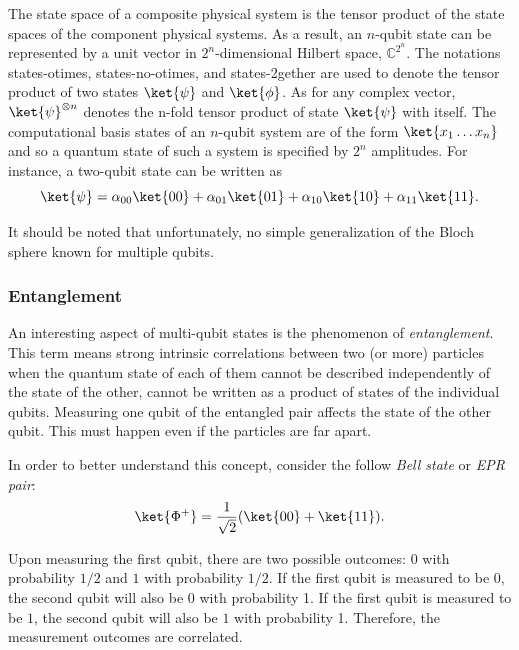  The state space of a composite physical system is the tensor product of the state spaces of the component physical systems. As a result, an $n$-qubit state can be represented by a unit vector in $2^n$-dimensional Hilbert space, $\mathbb{C}^{2^{n}}$. The notations \gls{states-otimes}, \gls{states-no-otimes}, and \gls{states-2gether} are  used to denote the tensor product of two states $\ket{\psi}$ and $\ket{\phi}$. As for any complex vector, $\ket{\psi}^{\otimes n}$ denotes the n-fold tensor product of state $\ket{\psi}$ with itself. The computational basis states of an $n$-qubit system are of the form $\ket{x_{1}\ldots x_{n}}$ and so a quantum state of such a system is specified by $2^{n}$ amplitudes. For instance, a two-qubit state can be written as
\begin{equation*}
  \ket{\psi} = \alpha_{00}\ket{00} + \alpha_{01}\ket{01} + \alpha_{10}\ket{10} + \alpha_{11}\ket{11}.
\end{equation*}

It should be noted that unfortunately, no simple generalization of the Bloch sphere known for multiple qubits.


\subsubsection{Entanglement}
An interesting aspect of multi-qubit states is the phenomenon of \emph{entanglement}. This term means strong intrinsic correlations between two (or more) particles when the quantum state of each of them cannot be described independently of the state of the other,  cannot be written as a product of states of the individual qubits. Measuring one qubit of the entangled pair affects the state of the other qubit. This must happen even if the particles are far apart.

In order to better understand this concept, consider the follow \emph{Bell state} or \emph{EPR pair}:
\begin{equation*}
  \ket{\Phi^{+}} = \frac{1}{\sqrt{2}}(\ket{00} + \ket{11}).
\end{equation*}

Upon measuring the first qubit, there are two possible outcomes: $0$ with probability $1/2$ and $1$ with probability $1/2$. If the first qubit is measured to be $0$, the second qubit will also be $0$ with probability 1. If the first qubit is measured to be $1$, the second qubit will also be $1$ with probability 1. Therefore, the measurement outcomes are correlated.

